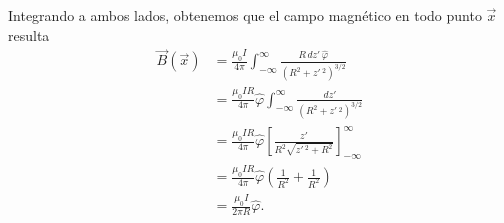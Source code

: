 \begin{ejemplo}
Integrando a ambos lados, obtenemos que el campo magnético en todo punto $\Vec{x}$ resulta
\begin{align*}
 \vec{B}(\vec{x}) &= \frac{\mu_0 I}{4\pi} \int_{-\infty}^{\infty} \frac{R\,dz' \,\hat{\varphi}}{(R^2 + z'\,^2)^{3/2}} \\
&= \frac{\mu_0 IR}{4\pi} \hat{\varphi} \int_{-\infty}^{ \infty} \frac{dz'}{(R^2 + z'\,^2)^{3/2}}  \\
&= \frac{\mu_0 IR}{4\pi} \hat{\varphi}   \left[ \frac{z'}{R^2 \sqrt{z'\,^2 + R^2}} \right]_{-\infty}^{ \infty} \\
&= \frac{\mu_0 IR}{4\pi} \hat{\varphi}  \left( \frac{1}{R^2} + \frac{1}{R^2} \right) \\
&= \frac{\mu_0 I}{2\pi R} \hat{\varphi} .   
\end{align*}

\end{ejemplo}

